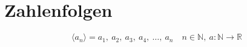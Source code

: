 \section{Zahlenfolgen}

\[
	\langle a_n \rangle = a_1,\ a_2,\ a_3,\ a_4,\ \ldots,\ a_n \quad n \in \mathbb{N},\ a : \mathbb{N} \rightarrow \mathbb{R}
\]







